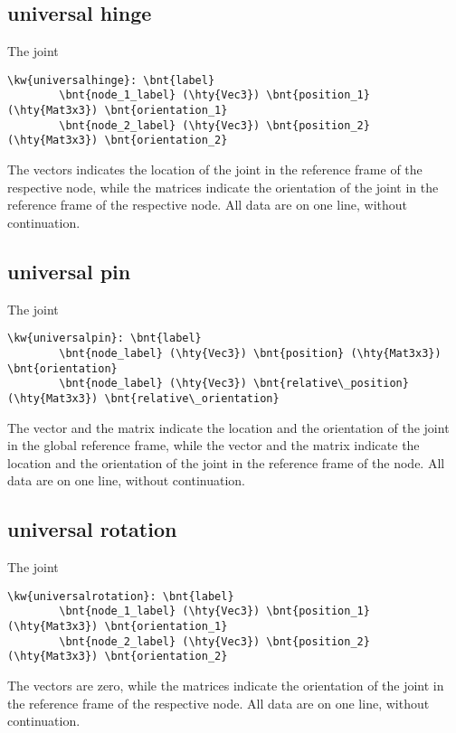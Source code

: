 \subsection{universal hinge}
The  joint
\begin{Verbatim}[commandchars=\\\{\}]
    \kw{universalhinge}: \bnt{label}
        \bnt{node_1_label} (\hty{Vec3}) \bnt{position_1} (\hty{Mat3x3}) \bnt{orientation_1}
        \bnt{node_2_label} (\hty{Vec3}) \bnt{position_2} (\hty{Mat3x3}) \bnt{orientation_2}
\end{Verbatim}
The  vectors indicates the location of the joint
in the reference frame of the respective node,
while the  matrices indicate the orientation of the joint
in the reference frame of the respective node.
All data are on one line, without continuation.

\subsection{universal pin}
The  joint
\begin{Verbatim}[commandchars=\\\{\}]
    \kw{universalpin}: \bnt{label}
        \bnt{node_label} (\hty{Vec3}) \bnt{position} (\hty{Mat3x3}) \bnt{orientation}
        \bnt{node_label} (\hty{Vec3}) \bnt{relative\_position} (\hty{Mat3x3}) \bnt{relative\_orientation}
\end{Verbatim}
The  vector and the  matrix indicate 
the location and the orientation of the joint in the global reference frame, 
while the  vector
and the  matrix indicate
the location and the orientation of the joint
in the reference frame of the node.
All data are on one line, without continuation.

\subsection{universal rotation}
The  joint
\begin{Verbatim}[commandchars=\\\{\}]
    \kw{universalrotation}: \bnt{label}
        \bnt{node_1_label} (\hty{Vec3}) \bnt{position_1} (\hty{Mat3x3}) \bnt{orientation_1}
        \bnt{node_2_label} (\hty{Vec3}) \bnt{position_2} (\hty{Mat3x3}) \bnt{orientation_2}
\end{Verbatim}
The  vectors are zero,
while the  matrices indicate the orientation of the joint
in the reference frame of the respective node.
All data are on one line, without continuation.


